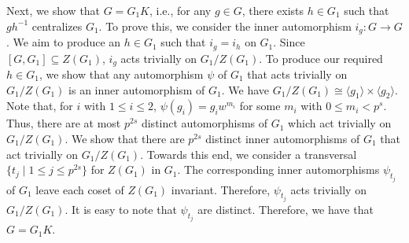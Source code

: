 \documentclass[preprint,sort&compress,12pt]{elsarticle}
\numberwithin{equation}{section}
\theoremstyle{definition}
\begin{document}
    Next, we show that $G=G_1K$, i.e., for any $g \in G$, there exists $h \in G_1$ such that $gh^{-1}$ centralizes $G_1$. To prove this, we consider the inner automorphism $i_g:G \to G$. We aim to produce an $h \in G_1$ such that $i_g=i_h$ on $G_1$. 
    Since $[G,G_1] \subseteq Z(G_1)$,  $i_g$ acts trivially on $G_1/Z(G_1)$.
    To produce our required $h \in G_1$, we show that any automorphism $\psi$ of $G_1$ that acts trivially on $G_1/Z(G_1)$ is an inner automorphism of $G_1$. We have $G_1/Z(G_1) \cong \langle g_1 \rangle \times \langle g_2 \rangle$. Note that, for $i$ with $1 \leq i \leq 2$, ${\psi(g_i)=g_iw^{m_i}}$ for some $m_i$ with $0 \leq m_i < p^s$. Thus, there are at most $p^{2s}$ distinct automorphisms of $G_1$ which act trivially on $G_1/Z(G_1)$. We show that there are $p^{2s}$ distinct inner automorphisms of $G_1$ that act trivially on $G_1/Z(G_1)$. Towards this end, we consider a transversal $\{t_j \mid 1 \leq j \leq p^{2s}\}$ for $Z(G_1)$ in $G_1$. The corresponding inner automorphisms $\psi_{t_j}$ of $G_1$  leave each coset of $Z(G_1)$ invariant. 
Therefore, $\psi_{t_j}$ acts trivially on $G_1/Z(G_1)$. 
It is easy to note that $\psi_{t_j}$ are distinct. Therefore, we have that $G=G_1K$. 

    
    
\end{document}
